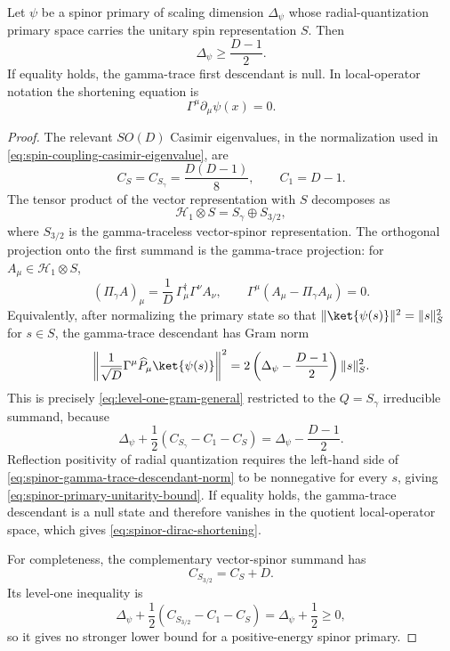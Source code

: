 \begin{theorem}
\label{thm:spinor-unitarity-bound}
Let \(\psi\) be a spinor primary of scaling dimension \(\Delta_\psi\) whose
radial-quantization primary space carries the unitary spin representation
\(S\).  Then
\begin{equation}
  \Delta_\psi\ge\frac{D-1}{2}.
  \label{eq:spinor-primary-unitarity-bound}
\end{equation}
If equality holds, the gamma-trace first descendant is null.  In local-operator
notation the shortening equation is
\begin{equation}
  \Gamma^\mu\partial_\mu\psi(x)=0 .
  \label{eq:spinor-dirac-shortening}
\end{equation}
\end{theorem}

\begin{proof}
The relevant \(SO(D)\) Casimir eigenvalues, in the normalization used in
\eqref{eq:spin-coupling-casimir-eigenvalue}, are
\[
  C_S=C_{S_\gamma}=\frac{D(D-1)}8,
  \qquad
  C_1=D-1 .
\]
The tensor product of the vector representation with \(S\) decomposes as
\[
  \mathcal H_1\otimes S
  =
  S_\gamma\oplus S_{3/2},
\]
where \(S_{3/2}\) is the gamma-traceless vector-spinor representation.  The
orthogonal projection onto the first summand is the gamma-trace projection:
for \(A_\mu\in\mathcal H_1\otimes S\),
\[
  (\Pi_\gamma A)_\mu
  =
  \frac1D\,\Gamma_\mu^\dagger\Gamma^\nu A_\nu,
  \qquad
  \Gamma^\mu(A_\mu-\Pi_\gamma A_\mu)=0 .
\]
Equivalently, after normalizing the primary state so that
\(\|\ket{\psi(s)}\|^2=\|s\|_S^2\) for \(s\in S\), the gamma-trace descendant
has Gram norm
\begin{equation}
  \left\|
    \frac1{\sqrt D}\Gamma^\mu\widehat P_\mu\ket{\psi(s)}
  \right\|^2
  =
  2\left(\Delta_\psi-\frac{D-1}{2}\right)\|s\|_S^2 .
  \label{eq:spinor-gamma-trace-descendant-norm}
\end{equation}
This is precisely \eqref{eq:level-one-gram-general} restricted to the
\(Q=S_\gamma\) irreducible summand, because
\[
  \Delta_\psi+\frac12(C_{S_\gamma}-C_1-C_S)
  =
  \Delta_\psi-\frac{D-1}{2}.
\]
Reflection positivity of radial quantization requires the left-hand side of
\eqref{eq:spinor-gamma-trace-descendant-norm} to be nonnegative for every
\(s\), giving \eqref{eq:spinor-primary-unitarity-bound}.  If equality holds,
the gamma-trace descendant is a null state and therefore vanishes in the
quotient local-operator space, which gives
\eqref{eq:spinor-dirac-shortening}.

For completeness, the complementary vector-spinor summand has
\[
  C_{S_{3/2}}=C_S+D .
\]
Its level-one inequality is
\[
  \Delta_\psi+\frac12(C_{S_{3/2}}-C_1-C_S)
  =
  \Delta_\psi+\frac12\ge0,
\]
so it gives no stronger lower bound for a positive-energy spinor primary.
\end{proof}

